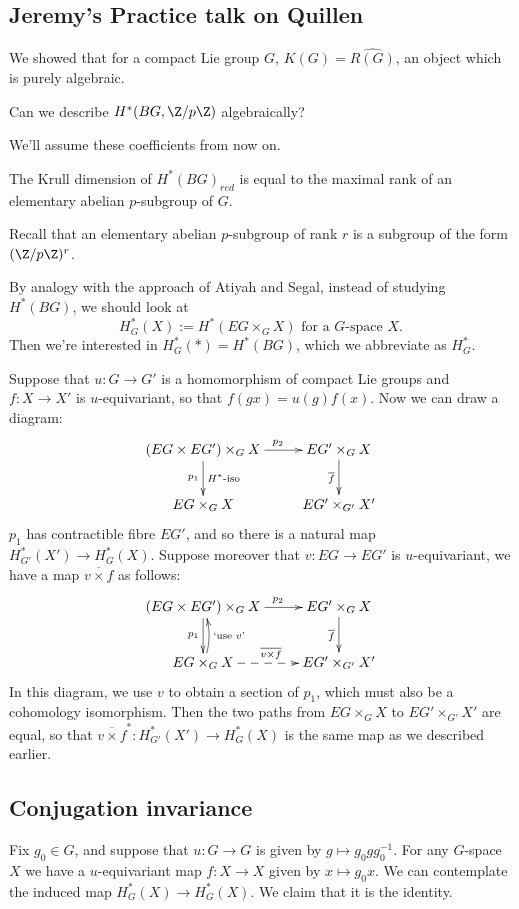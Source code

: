 \documentclass[11pt]{article}
\newcommand{\KanSemResponse}[1]
{
\thispagestyle{fancy}
\section{#1}
}
\begin{document}
\begin{JeremyQuillenPractice}
\KanSemResponse
{Jeremy's Practice talk on Quillen}
We showed that for a compact Lie group $G$, $K(G)=\widehat{R(G)}$, an object which is purely algebraic.
\begin{question}
Can we describe $H^*(BG,\Z/p\Z)$ algebraically?
\end{question}
We'll assume these coefficients from now on.
\begin{conjecture}
The Krull dimension of $H^*(BG)_{red}$ is equal to the maximal rank of an elementary abelian $p$-subgroup of $G$.
\end{conjecture}
\noindent Recall that an elementary abelian $p$-subgroup of rank $r$ is a subgroup of the form $(\Z/p\Z)^r$.

By analogy with the approach of Atiyah and Segal, instead of studying $H^*(BG)$, we should look at 
\[H^*_G(X):=H^*(EG\times_G X)\text{ for a $G$-space $X$}.\]
Then we're interested in $H^*_G(\ast)=H^*(BG)$, which we abbreviate as $H_G^*$.

Suppose that $u:G\to G'$ is a homomorphism of compact Lie groups and $f:X\to X'$ is $u$-equivariant, so that $f(gx)=u(g)f(x)$. Now we can draw a diagram:
\[\xymatrix{
(EG\times EG')\times_G X\ar[r]^{\ \ \ p_2}\ar[d]_{p_1}^{\text{$H^*$-iso}}&EG'\times_GX\ar[d]_{\overline f}\\
EG\times_G X&EG'\times_{G'}X'
}\]
$p_1$ has contractible fibre $EG'$, and so there is a natural map $H^*_{G'}(X')\to H^*_{G}(X)$. Suppose moreover that $v:EG\to EG'$ is $u$-equivariant, we have a map ${\overline{v\times f}}$ as follows:
\[\xymatrix{
(EG\times EG')\times_G X\ar[r]^{\ \ \ p_2}\ar[d]_{p_1}&EG' \times_GX\ar[d]_{\overline f}\\
\ar@/_1ex/[u]_{\text{`use $v$'}}\ar@{-->}[r]^{\overline{v\times f}}EG\times_G X&EG'\times_{G'}X'
}\]
In this diagram, we use $v$ to obtain a section of $p_1$, which must also be a cohomology isomorphism. Then the two paths from $EG\times_G X$ to $EG'\times_{G'}X'$ are equal, so that $\overline{v\times f}^*:H^*_{G'}(X')\to H^*_{G}(X)$ is the same map as we described earlier.
\subsection*{Conjugation invariance}
Fix $g_0\in G$, and suppose that $u:G\to G$ is given by $g\mapsto g_0gg_0^{-1}$. For any $G$-space $X$ we have a $u$-equivariant map $f:X\to X$ given by $x\mapsto g_0x$. We can contemplate the induced map $H^*_G(X)\to H^*_G(X)$. We claim that it is the identity.


\end{JeremyQuillenPractice}
\end{document}
